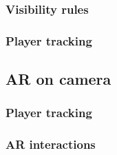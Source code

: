 			\subsubsection{Visibility rules} \label{focus:map:visibility}
			
			\subsubsection{Player tracking}
		
		\subsection{AR on camera}
			
			\subsubsection{Player tracking}
			
			\subsubsection{AR interactions}
